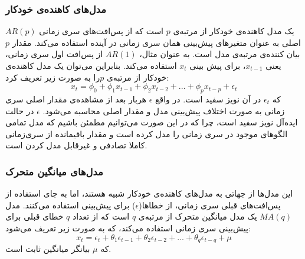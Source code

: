 \subsubsection{مدل‌های کاهنده‌ی خودکار}
$AR(p)$ یک مدل کاهنده‌ی خودکار از مرتبه‌ی $p$ است که از پس‌افت‌های سری زمانی اصلی به عنوان متغیرهای پیش‌بینی همان سری زمانی در آینده استفاده می‌کند. مقدار $p$  بیان کننده‌ی مرتبه‌ی مدل است. به عنوان مثال، $AR(1)$ از پس‌افت اول سری زمانی، یعنی $x_{t-1}$، برای پیش بینی $x_t$ استفاده می‌کند. بنابراین می‌توان  یک مدل کاهنده‌ی خودکار  از مرتبه‌ی $p$را به صورت زیر تعریف کرد\cite{ariyo2014stock}:
\begin{equation}
	x_t = \phi_0 + \phi_1 x_{t-1} + \phi_2 x_{t-2} + ... + \phi_p x_{t-p} + \epsilon_t
\end{equation}
که $\epsilon_t$ در آن نویز سفید است. در واقع $\epsilon$ هربار بعد از مشاهده‌ی مقدار اصلی سری زمانی به صورت اختلاف پیش‌بینی مدل و مقدار اصلی محاسبه می‌شود. $\epsilon$ در حالت ایده‌آل نویز سفید است، چرا که در این صورت می‌توانیم مطمئن باشیم که مدل تمامی الگوهای موجود در سری زمانی را مدل کرده است و مقدار باقیمانده از سری‌زمانی کاملا تصادفی و غیرقابل مدل کردن است.

\subsubsection{مدل‌های میانگین متحرک}
این مدل‌‌ها از جهاتی به مدل‌های کاهنده‌ی خودکار شبیه هستند، اما به جای استفاده از پس‌افت‌های قبلی سری زمانی،‌ از خطاها($\epsilon$) برای پیش‌بینی استفاده می‌کنند. مدل‌ $MA(q)$ یک مدل‌ میانگین متحرک از مرتبه‌ی $q$ است که از تعداد $q$ خطای قبلی برای پیش‌بینی سری زمانی استفاده می‌کند، که به صورت زیر تعریف می‌شود:
\begin{equation}
	x_t = \epsilon_t + \theta_1 \epsilon_{t-1} + \theta_2 \epsilon_{t-2} + ... + \theta_q \epsilon_{t-q} + \mu
\end{equation}
که $\mu$ بیانگر میانگین ثابت است.
